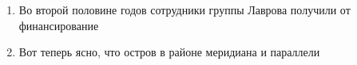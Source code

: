 \documentclass[paper=a4, fontsize=11pt]{scrartcl}
\begin{document}
\begin{enumerate}
    \item Во второй половине  годов сотрудники группы Лаврова получили от   финансирование
    \item Вот теперь ясно, что остров в районе  \raisebox{-\baselineskip}{\shortstack{\underline{\hspace{3cm}}\\kahdeksaskymmenes}} меридиана и \raisebox{-\baselineskip}{\shortstack{\underline{\hspace{3cm}}\\kahdeskymmenes}} параллели
\end{enumerate}
\end{document}
